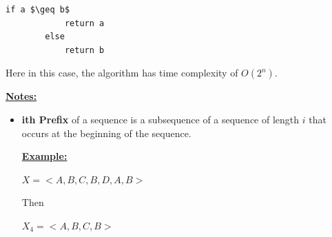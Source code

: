 \documentclass[12pt]{article}
\begin{document}
\begin{enumerate}[1.]
\begin{itemize}
\begin{lstlisting}[mathescape=true]
        if a $\geq b$
            return a
        else
            return b
    \end{lstlisting}

    \bigskip

    Here in this case, the algorithm has time complexity of $O(2^n)$.

    \end{itemize}
    \underline{\textbf{Notes:}}

    \bigskip

    \begin{itemize}
        \item \textbf{ith Prefix} of a sequence is a subsequence of a sequence of length $i$ that occurs at the beginning of the sequence.

        \bigskip

        \underline{\textbf{Example:}}

        \bigskip

        $X = <A,B,C,B,D,A,B>$

        \bigskip

        Then

        \bigskip

        $X_4 = <A,B,C,B>$
    \end{itemize}
\end{enumerate}
\end{document}
